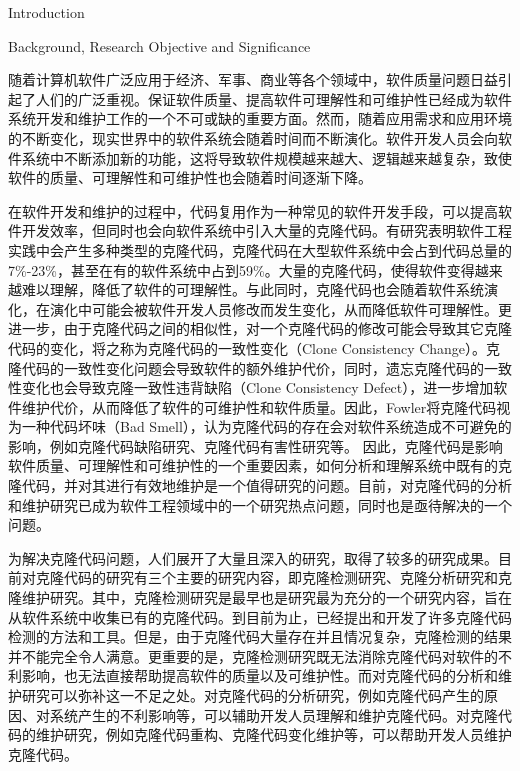 
{Introduction}

{Background, Research Objective and Significance}

随着计算机软件广泛应用于经济、军事、商业等各个领域中，软件质量问题日益引起了人们的广泛重视。保证软件质量、提高软件可理解性和可维护性已经成为软件系统开发和维护工作的一个不可或缺的重要方面。然而，随着应用需求和应用环境的不断变化，现实世界中的软件系统会随着时间而不断演化。软件开发人员会向软件系统中不断添加新的功能，这将导致软件规模越来越大、逻辑越来越复杂，致使软件的质量、可理解性和可维护性也会随着时间逐渐下降。

在软件开发和维护的过程中，代码复用作为一种常见的软件开发手段，可以提高软件开发效率，但同时也会向软件系统中引入大量的克隆代码。有研究表明软件工程实践中会产生多种类型的克隆代码\cite{roy2007survey}，克隆代码在大型软件系统中会占到代码总量的7\%-23\%\cite{baker1995finding}\cite{kontogiannis1996pattern}\cite{lague1997assessing}，甚至在有的软件系统中占到59\%\cite{ducasse1999language}。大量的克隆代码，使得软件变得越来越难以理解，降低了软件的可理解性。与此同时，克隆代码也会随着软件系统演化，在演化中可能会被软件开发人员修改而发生变化，从而降低软件可理解性。更进一步，由于克隆代码之间的相似性，对一个克隆代码的修改可能会导致其它克隆代码的变化，将之称为克隆代码的一致性变化（Clone Consistency Change）。克隆代码的一致性变化问题会导致软件的额外维护代价，同时，遗忘克隆代码的一致性变化也会导致克隆一致性违背缺陷（Clone Consistency Defect），进一步增加软件维护代价，从而降低了软件的可维护性和软件质量。因此，Fowler将克隆代码视为一种代码坏味（Bad Smell）\cite{fowler2009refactoring}，认为克隆代码的存在会对软件系统造成不可避免的影响，例如克隆代码缺陷研究\cite{juergens2009code}\cite{gauthier2013uncovering}\cite{wagner2016relationship}、克隆代码有害性研究\cite{kapser2008cloning}\cite{selim2010studying}\cite{wang2012can}等。
因此，克隆代码是影响软件质量、可理解性和可维护性的一个重要因素，如何分析和理解系统中既有的克隆代码，并对其进行有效地维护是一个值得研究的问题。目前，对克隆代码的分析和维护研究已成为软件工程领域中的一个研究热点问题，同时也是亟待解决的一个问题。

为解决克隆代码问题，人们展开了大量且深入的研究，取得了较多的研究成果。目前对克隆代码的研究有三个主要的研究内容，即克隆检测研究、克隆分析研究和克隆维护研究。其中，克隆检测研究是最早也是研究最为充分的一个研究内容，旨在从软件系统中收集已有的克隆代码。到目前为止，已经提出和开发了许多克隆代码检测的方法和工具\cite{roy2008nicad}\cite{kamiya2002ccfinder}\cite{jiang2007deckard}。但是，由于克隆代码大量存在并且情况复杂，克隆检测的结果并不能完全令人满意。更重要的是，克隆检测研究既无法消除克隆代码对软件的不利影响，也无法直接帮助提高软件的质量以及可维护性。而对克隆代码的分析和维护研究可以弥补这一不足之处。对克隆代码的分析研究，例如克隆代码产生的原因、对系统产生的不利影响等，可以辅助开发人员理解和维护克隆代码。对克隆代码的维护研究，例如克隆代码重构、克隆代码变化维护等，可以帮助开发人员维护克隆代码。

